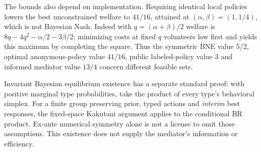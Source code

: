 The bounds also depend on implementation. Requiring identical local policies
lowers the best unconstrained welfare to $41/16$, attained at
$(\alpha,\beta)=(1,1/4)$, which is not Bayesian Nash. Indeed with
$q=(\alpha+\beta)/2$ welfare is
$8q-4q^2-\alpha/2-3\beta/2$; minimizing costs at fixed $q$ volunteers low
first and yields this maximum by completing the square. Thus the symmetric
BNE value $5/2$, optimal anonymous-policy value $41/16$, public labeled-policy
value $3$ and informed mediator value $13/4$ concern different feasible sets.

Invariant Bayesian equilibrium existence has a separate standard proof: with
positive marginal type probabilities, take the product of every type's
behavioral simplex. For a finite group preserving prior, typed actions and
\emph{interim} best responses, the fixed-space Kakutani argument applies to
the conditional BR product. Ex-ante numerical symmetry alone is not a license
to omit those assumptions. This existence does not supply the mediator's
information or efficiency.
